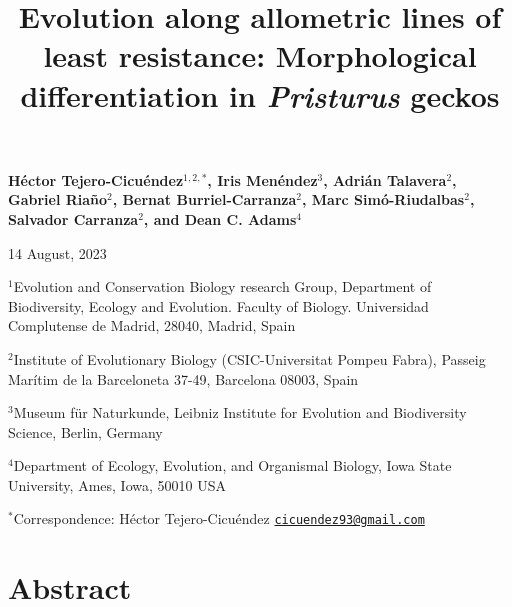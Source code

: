 \documentclass[
  11pt,
]{article}
\title{Evolution along allometric lines of least resistance:
Morphological differentiation in \emph{Pristurus} geckos}
\author{}
\date{\vspace{-2.5em}}
\begin{document}
\maketitle

\begin{center}
\textbf{H{\'{e}}ctor Tejero-Cicu{\'{e}}ndez$^{1,2,*}$,  Iris Men{\'{e}}ndez$^{3}$, Adri{\'{a}}n Talavera$^{2}$, Gabriel Riaño$^{2}$, Bernat Burriel-Carranza$^{2}$, Marc Sim{\'{o}}-Riudalbas$^{2}$, Salvador Carranza$^{2}$, and Dean C. Adams$^{4}$}
\end{center}

\begin{center}14 August, 2023\end{center}

\(^{1}\)Evolution and Conservation Biology research Group, Department of
Biodiversity, Ecology and Evolution. Faculty of Biology. Universidad
Complutense de Madrid, 28040, Madrid, Spain

\(^{2}\)Institute of Evolutionary Biology (CSIC-Universitat Pompeu
Fabra), Passeig Marítim de la Barceloneta 37-49, Barcelona 08003, Spain

\(^{3}\)Museum für Naturkunde, Leibniz Institute for Evolution and
Biodiversity Science, Berlin, Germany

\(^{4}\)Department of Ecology, Evolution, and Organismal Biology, Iowa
State University, Ames, Iowa, 50010 USA

\(^{*}\)Correspondence: Héctor Tejero-Cicuéndez
\href{mailto:cicuendez93@gmail.com}{\nolinkurl{cicuendez93@gmail.com}}

\newpage

\hypertarget{abstract}{%
\section{Abstract}\label{abstract}}
\end{document}
